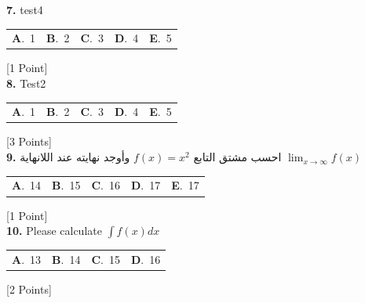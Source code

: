 \documentclass[12pt]{article}
\newcommand{\choice}[2]{\textbf{#1}.~#2}
\begin{document}
\noindent \textbf{\textenglish{7.}} {\textenglish{test4}}

\begin{tabularx}{\linewidth}{@{}*{5}{Y}@{}}
\choice{A}{{{\textenglish{1}}}} & \choice{B}{{{\textenglish{2}}}} & \choice{C}{{{\textenglish{3}}}} & \choice{D}{{{\textenglish{4}}}} & \choice{E}{{{\textenglish{5}}}} \\
\end{tabularx}
\hfill {\textenglish{[1 Point]}}\\[0.5em]

\noindent \textbf{\textenglish{8.}} {\textenglish{Test2}}

\begin{tabularx}{\linewidth}{@{}*{5}{Y}@{}}
\choice{A}{{{\textenglish{1}}}} & \choice{B}{{{\textenglish{2}}}} & \choice{C}{{{\textenglish{3}}}} & \choice{D}{{{\textenglish{4}}}} & \choice{E}{{{\textenglish{5}}}} \\
\end{tabularx}
\hfill {\textenglish{[3 Points]}}\\[0.5em]

\noindent \textbf{\textenglish{9.}} {\textarabic{احسب مشتق التابع }}\( f(x) = x^2\){\textarabic{ وأوجد نهايته عند اللانهاية }}\(\lim_{x \to \infty}f(x)\)

\begin{tabularx}{\linewidth}{@{}*{5}{Y}@{}}
\choice{A}{{{\textenglish{14}}}} & \choice{B}{{{\textenglish{15}}}} & \choice{C}{{{\textenglish{16}}}} & \choice{D}{{{\textenglish{17}}}} & \choice{E}{{{\textenglish{17}}}} \\
\end{tabularx}
\hfill {\textenglish{[1 Point]}}\\[0.5em]

\noindent \textbf{\textenglish{10.}} {\textenglish{Please calculate }}\(\int f(x)dx\)

\begin{tabularx}{\linewidth}{@{}*{4}{Y}@{}}
\choice{A}{{{\textenglish{13}}}} & \choice{B}{{{\textenglish{14}}}} & \choice{C}{{{\textenglish{15}}}} & \choice{D}{{{\textenglish{16}}}} \\
\end{tabularx}
\hfill {\textenglish{[2 Points]}}\\[0.5em]
\end{document}
